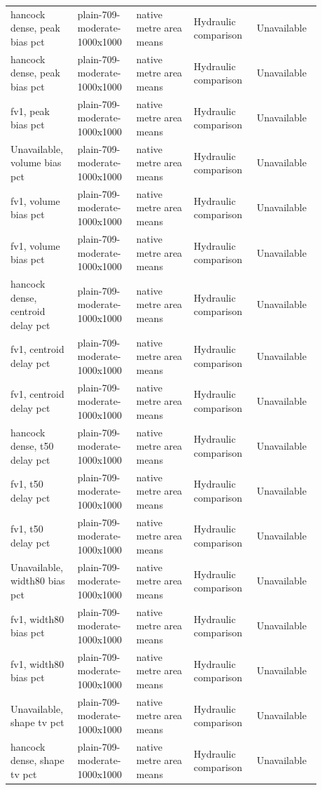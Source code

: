 \begin{longtable}{p{0.1760\linewidth}p{0.1760\linewidth}p{0.1760\linewidth}p{0.1760\linewidth}p{0.1760\linewidth}}
hancock dense, peak bias pct & plain-709-moderate-1000x1000 & native metre area means & Hydraulic comparison & Unavailable \\
hancock dense, peak bias pct & plain-709-moderate-1000x1000 & native metre area means & Hydraulic comparison & Unavailable \\
fv1, peak bias pct & plain-709-moderate-1000x1000 & native metre area means & Hydraulic comparison & Unavailable \\
Unavailable, volume bias pct & plain-709-moderate-1000x1000 & native metre area means & Hydraulic comparison & Unavailable \\
fv1, volume bias pct & plain-709-moderate-1000x1000 & native metre area means & Hydraulic comparison & Unavailable \\
fv1, volume bias pct & plain-709-moderate-1000x1000 & native metre area means & Hydraulic comparison & Unavailable \\
hancock dense, centroid delay pct & plain-709-moderate-1000x1000 & native metre area means & Hydraulic comparison & Unavailable \\
fv1, centroid delay pct & plain-709-moderate-1000x1000 & native metre area means & Hydraulic comparison & Unavailable \\
fv1, centroid delay pct & plain-709-moderate-1000x1000 & native metre area means & Hydraulic comparison & Unavailable \\
hancock dense, t50 delay pct & plain-709-moderate-1000x1000 & native metre area means & Hydraulic comparison & Unavailable \\
fv1, t50 delay pct & plain-709-moderate-1000x1000 & native metre area means & Hydraulic comparison & Unavailable \\
fv1, t50 delay pct & plain-709-moderate-1000x1000 & native metre area means & Hydraulic comparison & Unavailable \\
Unavailable, width80 bias pct & plain-709-moderate-1000x1000 & native metre area means & Hydraulic comparison & Unavailable \\
fv1, width80 bias pct & plain-709-moderate-1000x1000 & native metre area means & Hydraulic comparison & Unavailable \\
fv1, width80 bias pct & plain-709-moderate-1000x1000 & native metre area means & Hydraulic comparison & Unavailable \\
Unavailable, shape tv pct & plain-709-moderate-1000x1000 & native metre area means & Hydraulic comparison & Unavailable \\
hancock dense, shape tv pct & plain-709-moderate-1000x1000 & native metre area means & Hydraulic comparison & Unavailable \\

\end{longtable}
